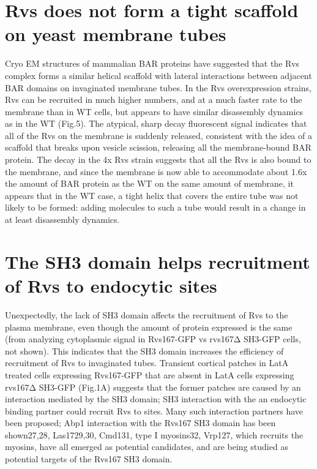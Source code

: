 \section{Rvs does not form a tight scaffold on yeast membrane tubes}
Cryo EM structures of mammalian BAR proteins have suggested that the Rvs complex forms a similar helical scaffold with lateral interactions between adjacent BAR domains on invaginated membrane tubes. In the Rvs overexpression strains, Rvs can be recruited in much higher numbers, and at a much faster rate to the membrane than in WT cells, but appears to have similar disassembly dynamics as in the WT (Fig.5). The atypical, sharp decay fluorescent signal indicates that all of the Rvs on the membrane is suddenly released, consistent with the idea of a scaffold that breaks upon vesicle scission, releasing all the membrane-bound BAR protein. The decay in the 4x Rvs strain suggests that all the Rvs is also bound to the membrane, and since the membrane is now able to accommodate about 1.6x the amount of BAR protein as the WT on the same amount of membrane, it appears that in the WT case, a tight helix that covers the entire tube was not likely to be formed: adding molecules to such a tube would result in a change in at least disassembly dynamics.

\section{The SH3 domain helps recruitment of Rvs to endocytic sites}
Unexpectedly, the lack of SH3 domain affects the recruitment of Rvs to the plasma membrane, even though the amount of protein expressed is the same (from analyzing cytoplasmic signal in Rvs167-GFP vs rvs167Δ SH3-GFP cells, not shown). This indicates that the SH3 domain increases the efficiency of recruitment of Rvs to invaginated tubes. Transient cortical patches in LatA treated cells expressing Rvs167-GFP that are absent in LatA cells expressing rvs167Δ SH3-GFP (Fig.1A) suggests that the former patches are caused by an interaction mediated by the SH3 domain; SH3 interaction with the an endocytic binding partner could recruit Rvs to sites. Many such interaction partners have been proposed; Abp1 interaction with the Rvs167 SH3 domain has been shown27,28, Las1729,30, Cmd131, type I myosins32, Vrp127, which recruits the myosins, have all emerged as potential candidates, and are being studied as potential targets of the Rvs167 SH3 domain.

